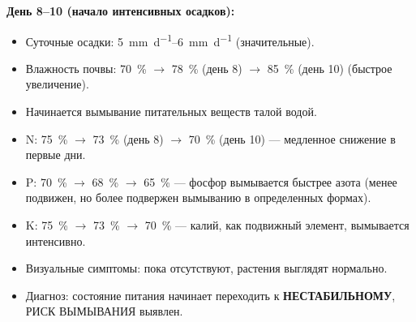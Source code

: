 \textbf{День 8--10 (начало интенсивных осадков):}
\begin{itemize}
    \item Суточные осадки: \SIrange{5}{6}{\milli\meter\per\day} (значительные).
    \item Влажность почвы: \SI{70}{\percent} $\to$ \SI{78}{\percent} (день \num{8}) $\to$ \SI{85}{\percent} (день \num{10}) (быстрое увеличение).
    \item Начинается вымывание питательных веществ талой водой.
    \item N: \SI{75}{\percent} $\to$ \SI{73}{\percent} (день \num{8}) $\to$ \SI{70}{\percent} (день \num{10}) --- медленное снижение в первые дни.
    \item P: \SI{70}{\percent} $\to$ \SI{68}{\percent} $\to$ \SI{65}{\percent} --- фосфор вымывается быстрее азота (менее подвижен, но более подвержен вымыванию в определенных формах).
    \item K: \SI{75}{\percent} $\to$ \SI{73}{\percent} $\to$ \SI{70}{\percent} --- калий, как подвижный элемент, вымывается интенсивно.
    \item Визуальные симптомы: пока отсутствуют, растения выглядят нормально.
    \item Диагноз: состояние питания начинает переходить к \textbf{НЕСТАБИЛЬНОМУ}, РИСК ВЫМЫВАНИЯ выявлен.
\end{itemize}

